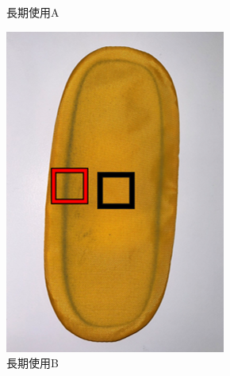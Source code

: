 \documentclass[main]{subfiles}
\begin{document}
\begin{figure}[htbp]
\begin{minipage}[htbp]{0.3\linewidth}
        \caption{長期使用A}
        \label{fig:label}
    \end{minipage}
    \begin{minipage}[htbp]{0.3\linewidth}
        \centering
        \includegraphics[keepaspectratio, width=0.8\linewidth, height=\linewidth]{figures/caring_brush_pad/choukiB.png}
        \caption{長期使用B}
        \label{fig:label}
    \end{minipage}
\end{figure}
\end{document}
